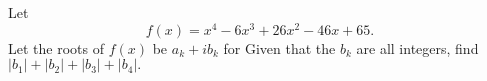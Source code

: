 Let \[f(x)=x^4-6x^3+26x^2-46x+65.\] Let the roots of $f(x)$ be $a_k+ib_k$ for   Given that the  $b_k$ are all integers, find $|b_1|+|b_2|+|b_3|+|b_4|.$